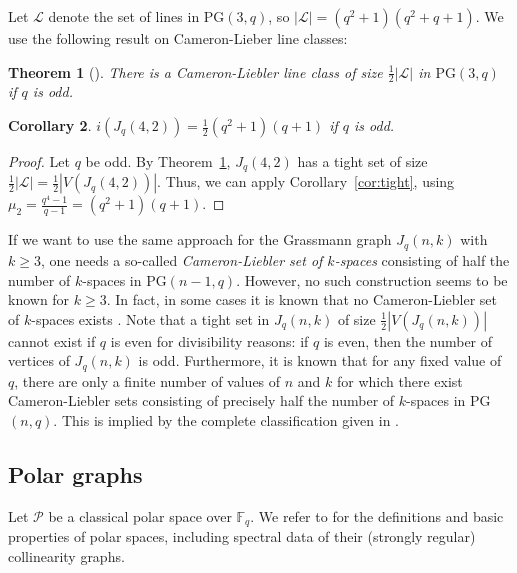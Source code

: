 \documentclass[a4paper,11pt]{article}
\newtheorem{theorem}{Theorem}[section]
\newtheorem{corollary}[theorem]{Corollary}
\theoremstyle{definition}
\begin{document}
Let \(\mathcal{L}\) denote the set of lines in PG\((3,q)\), so \(|\mathcal{L}|=(q^2+1)(q^2+q+1)\). We use the following result on Cameron-Lieber line classes:

\begin{theorem}[\cite{CLbruen}]\label{thm:CLbruen}
    There is a Cameron-Liebler line class of 
    size \(\frac12|\mathcal{L}|\) in \(\mathrm{PG}(3,q)\) if \(q\) is odd.
\end{theorem}

\begin{corollary}
    \(i(J_q(4,2))=\frac12(q^2+1)(q+1)\) if \(q\) is odd.
\end{corollary}
\begin{proof}
    Let $q$ be odd. By Theorem~\ref{thm:CLbruen}, $J_q(4,2)$ has a tight set of size $\frac12|\mathcal{L}| = \frac12|V(J_q(4,2))|$. Thus, we can apply Corollary~\ref{cor:tight}, using $\mu_2 = \frac{q^4-1}{q-1} = (q^2+1)(q+1)$.
\end{proof}


If we want to use the same approach for the Grassmann graph $J_q(n,k)$ with \(k\geq3\), one needs a so-called \emph{Cameron-Liebler set of \(k\)-spaces} \cite{CLk} consisting of half the number of $k$-spaces in PG$(n-1,q)$.
However, no such construction seems to be known for $k \geq 3$. In fact, in some cases it is known that no Cameron-Liebler set of $k$-spaces exists \cite{%
boolean1}.
Note that a tight set in $J_q(n,k)$ of size $\frac12|V(J_q(n,k))|$ cannot exist if $q$ is even for divisibility reasons: if $q$ is even, then the number of vertices of $J_q(n,k)$ is odd.
Furthermore, it is known that for any fixed value of $q$, there are only a finite number of values of $n$ and $k$ for which there exist Cameron-Liebler sets consisting of precisely half the number of $k$-spaces in PG$(n,q)$. This is implied by the complete classification given in \cite{Ihringer}.
 

\subsection{Polar graphs}\label{subsec:polar}

Let $\mathcal{P}$ be a classical polar space over $\mathbb{F}_q$. We refer to \cite[Chapter 2]{StronglyBrouwer} for the definitions and basic properties of polar spaces, including spectral data of their (strongly regular) collinearity graphs.
\end{document}
